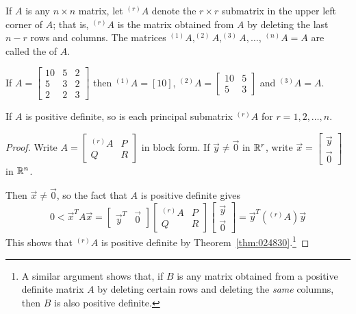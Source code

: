 \documentclass{ximera}
\begin{document}
If $A$ is any $n \times n$ matrix, let $^{(r)}A$ denote the $r \times r$ submatrix in the upper left corner of $A$; that is, $^{(r)}A$ is the matrix obtained from $A$ by deleting the last $n - r$ rows and columns. The matrices $^{(1)}A, ^{(2)}A, ^{(3)}A, \dots$, $^{(n)}A = A$ are called the  of $A$.


\begin{example}\label{exa:024883}
If $A = \left[ \begin{array}{rrr}
10 & 5 & 2 \\
5 & 3 & 2 \\
2 & 2 & 3
\end{array}\right]$ then $^{(1)}A = \left[ 10 \right]$, $^{(2)}A = \left[ \begin{array}{rr}
10 & 5 \\
5 & 3
\end{array}\right]$ and $^{(3)}A = A$.
\end{example}

\begin{lemma}\label{lem:024890}
If $A$ is positive definite, so is each principal submatrix $^{(r)}A$ for $r = 1, 2, \dots, n$.
\end{lemma}

\begin{proof}
Write $A = \left[ \begin{array}{rr}
^{(r)}A & P \\
Q & R
\end{array}\right]$
 in block form. If $\vec{y} \neq \vec{0}$ in $\mathbb{R}^r$, write $\vec{x} = \left[ \begin{array}{r}
 \vec{y} \\
 \vec{0}
 \end{array}\right]$ in $\mathbb{R}^n$.

Then $\vec{x} \neq \vec{0}$, so the fact that $A$ is positive definite gives
\begin{equation*}
0 < \vec{x}^TA\vec{x} = \left[ \begin{array}{rr}
\vec{y}^T & \vec{0}
\end{array}\right] \left[ \begin{array}{rr}
^{(r)}A & P \\
Q & R
\end{array}\right] \left[ \begin{array}{r}
\vec{y} \\
\vec{0}
\end{array}\right] = \vec{y}^T(^{(r)}A)\vec{y}
\end{equation*}
This shows that $^{(r)}A$ is positive definite by Theorem~\ref{thm:024830}.\footnote{A similar argument shows that, if $B$ is any matrix obtained from a positive definite matrix $A$ by deleting certain rows and deleting the \textit{same} columns, then $B$ is also positive definite.}
\end{proof}
\end{document}
